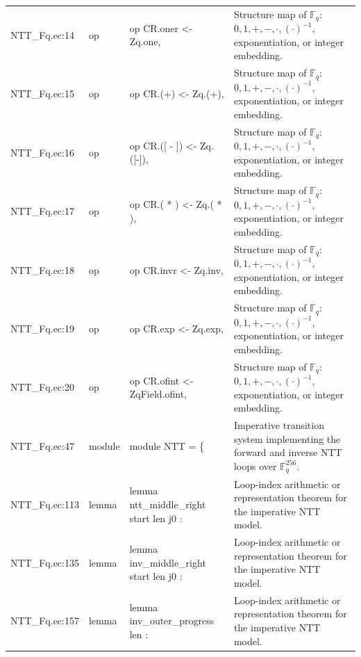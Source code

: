 \documentclass[10pt]{article}
\begin{document}
\begin{longtable}{L{0.11\textwidth}L{0.05\textwidth}L{0.38\textwidth}L{0.42\textwidth}}
NTT\_Fq.\allowbreak{}ec:\allowbreak{}14 & op & {\ttfamily\scriptsize op CR.oner <- Zq.one,} & Structure map of $\mathbb F_q$: $0,1,+,-,\cdot,(\cdot)^{-1}$, exponentiation, or integer embedding. \\
NTT\_Fq.\allowbreak{}ec:\allowbreak{}15 & op & {\ttfamily\scriptsize op CR.(+) <- Zq.(+),} & Structure map of $\mathbb F_q$: $0,1,+,-,\cdot,(\cdot)^{-1}$, exponentiation, or integer embedding. \\
NTT\_Fq.\allowbreak{}ec:\allowbreak{}16 & op & {\ttfamily\scriptsize op CR.([ - ]) <- Zq.([-]),} & Structure map of $\mathbb F_q$: $0,1,+,-,\cdot,(\cdot)^{-1}$, exponentiation, or integer embedding. \\
NTT\_Fq.\allowbreak{}ec:\allowbreak{}17 & op & {\ttfamily\scriptsize op CR.( * ) <- Zq.( * ),} & Structure map of $\mathbb F_q$: $0,1,+,-,\cdot,(\cdot)^{-1}$, exponentiation, or integer embedding. \\
NTT\_Fq.\allowbreak{}ec:\allowbreak{}18 & op & {\ttfamily\scriptsize op CR.invr  <- Zq.inv,} & Structure map of $\mathbb F_q$: $0,1,+,-,\cdot,(\cdot)^{-1}$, exponentiation, or integer embedding. \\
NTT\_Fq.\allowbreak{}ec:\allowbreak{}19 & op & {\ttfamily\scriptsize op CR.exp  <- Zq.exp,} & Structure map of $\mathbb F_q$: $0,1,+,-,\cdot,(\cdot)^{-1}$, exponentiation, or integer embedding. \\
NTT\_Fq.\allowbreak{}ec:\allowbreak{}20 & op & {\ttfamily\scriptsize op CR.ofint <- ZqField.ofint,} & Structure map of $\mathbb F_q$: $0,1,+,-,\cdot,(\cdot)^{-1}$, exponentiation, or integer embedding. \\
NTT\_Fq.\allowbreak{}ec:\allowbreak{}47 & module & {\ttfamily\scriptsize module NTT = \{} & Imperative transition system implementing the forward and inverse NTT loops over $\mathbb F_q^{256}$. \\
NTT\_Fq.\allowbreak{}ec:\allowbreak{}113 & lemma & {\ttfamily\scriptsize lemma ntt\_middle\_right start len j0 :} & Loop-index arithmetic or representation theorem for the imperative NTT model. \\
NTT\_Fq.\allowbreak{}ec:\allowbreak{}135 & lemma & {\ttfamily\scriptsize lemma inv\_middle\_right start len j0 :} & Loop-index arithmetic or representation theorem for the imperative NTT model. \\
NTT\_Fq.\allowbreak{}ec:\allowbreak{}157 & lemma & {\ttfamily\scriptsize lemma inv\_outer\_progress len :} & Loop-index arithmetic or representation theorem for the imperative NTT model. \\

\end{longtable}
\end{document}
